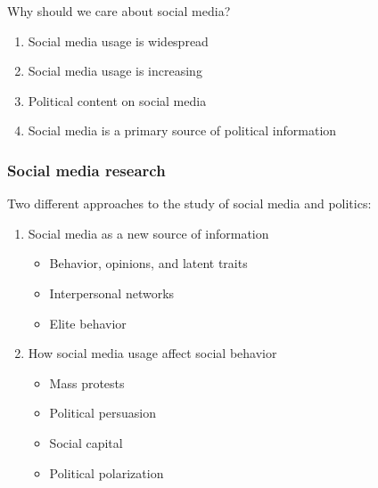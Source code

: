 \documentclass{beamer}
\begin{document}
\begin{frame}
	\centering Why should we care about social media? \vspace{.5cm}
	\begin{enumerate}
		\item Social media usage is widespread
		\item Social media usage is increasing
		\item Political content on social media
		\item Social media is a primary source of political information
	\end{enumerate}
\end{frame}


\begin{frame}
	\frametitle{Social media research}
	
	Two different approaches to the study of social media and politics:\vspace{.5cm}
	\begin{enumerate}
		\item Social media as a new source of information
		\begin{itemize}
			\item Behavior, opinions, and latent traits
			\item Interpersonal networks
			\item Elite behavior
		\end{itemize}
		\item How social media usage affect social behavior
		\begin{itemize}
			\item Mass protests
			\item Political persuasion
			\item Social capital
			\item Political polarization
		\end{itemize}
	\end{enumerate}
\end{frame}
\end{document}
